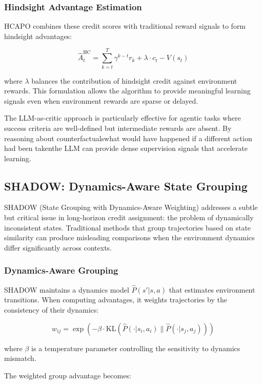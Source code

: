 \subsubsection{Hindsight Advantage Estimation}

HCAPO combines these credit scores with traditional reward signals to form hindsight advantages:

$$\hat{A}_t^{\text{HC}} = \sum_{k=t}^{T} \gamma^{k-t} r_k + \lambda \cdot c_t - V(s_t)$$

where $\lambda$ balances the contribution of hindsight credit against environment rewards. This formulation allows the algorithm to provide meaningful learning signals even when environment rewards are sparse or delayed.

The LLM-as-critic approach is particularly effective for agentic tasks where success criteria are well-defined but intermediate rewards are absent. By reasoning about counterfactualswhat would have happened if a different action had been takenthe LLM can provide dense supervision signals that accelerate learning.

\subsection{SHADOW: Dynamics-Aware State Grouping}

SHADOW (State Grouping with Dynamics-Aware Weighting) addresses a subtle but critical issue in long-horizon credit assignment: the problem of dynamically inconsistent states. Traditional methods that group trajectories based on state similarity can produce misleading comparisons when the environment dynamics differ significantly across contexts.

\subsubsection{Dynamics-Aware Grouping}

SHADOW maintains a dynamics model $\hat{P}(s'|s,a)$ that estimates environment transitions. When computing advantages, it weights trajectories by the consistency of their dynamics:

$$w_{ij} = \exp\left(-\beta \cdot \text{KL}\left(\hat{P}(\cdot|s_i, a_i) \| \hat{P}(\cdot|s_j, a_j)\right)\right)$$

where $\beta$ is a temperature parameter controlling the sensitivity to dynamics mismatch.

The weighted group advantage becomes:

